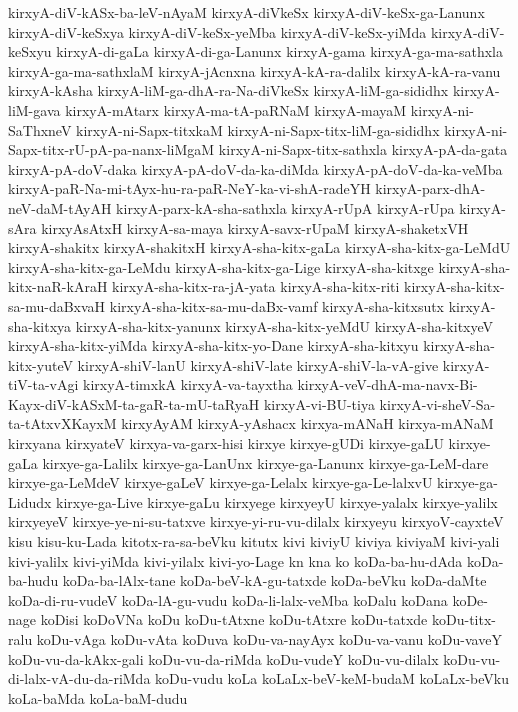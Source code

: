 {kirxyA-diV-kASx-ba-leV-nAyaM
kirxyA-diVkeSx
kirxyA-diV-keSx-ga-Lanunx
kirxyA-diV-keSxya
kirxyA-diV-keSx-yeMba
kirxyA-diV-keSx-yiMda
kirxyA-diV-keSxyu
kirxyA-di-gaLa
kirxyA-di-ga-Lanunx
kirxyA-gama
kirxyA-ga-ma-sathxla
kirxyA-ga-ma-sathxlaM
kirxyA-jAcnxna
kirxyA-kA-ra-dalilx
kirxyA-kA-ra-vanu
kirxyA-kAsha
kirxyA-liM-ga-dhA-ra-Na-diVkeSx
kirxyA-liM-ga-sididhx
kirxyA-liM-gava
kirxyA-mAtarx
kirxyA-ma-tA-paRNaM
kirxyA-mayaM
kirxyA-ni-SaThxneV
kirxyA-ni-Sapx-titxkaM
kirxyA-ni-Sapx-titx-liM-ga-sididhx
kirxyA-ni-Sapx-titx-rU-pA-pa-nanx-liMgaM
kirxyA-ni-Sapx-titx-sathxla
kirxyA-pA-da-gata
kirxyA-pA-doV-daka
kirxyA-pA-doV-da-ka-diMda
kirxyA-pA-doV-da-ka-veMba
kirxyA-paR-Na-mi-tAyx-hu-ra-paR-NeY-ka-vi-shA-radeYH
kirxyA-parx-dhA-neV-daM-tAyAH
kirxyA-parx-kA-sha-sathxla
kirxyA-rUpA
kirxyA-rUpa
kirxyA-sAra
kirxyAsAtxH
kirxyA-sa-maya
kirxyA-savx-rUpaM
kirxyA-shaketxVH
kirxyA-shakitx
kirxyA-shakitxH
kirxyA-sha-kitx-gaLa
kirxyA-sha-kitx-ga-LeMdU
kirxyA-sha-kitx-ga-LeMdu
kirxyA-sha-kitx-ga-Lige
kirxyA-sha-kitxge
kirxyA-sha-kitx-naR-kAraH
kirxyA-sha-kitx-ra-jA-yata
kirxyA-sha-kitx-riti
kirxyA-sha-kitx-sa-mu-daBxvaH
kirxyA-sha-kitx-sa-mu-daBx-vamf
kirxyA-sha-kitxsutx
kirxyA-sha-kitxya
kirxyA-sha-kitx-yanunx
kirxyA-sha-kitx-yeMdU
kirxyA-sha-kitxyeV
kirxyA-sha-kitx-yiMda
kirxyA-sha-kitx-yo-Dane
kirxyA-sha-kitxyu
kirxyA-sha-kitx-yuteV
kirxyA-shiV-lanU
kirxyA-shiV-late
kirxyA-shiV-la-vA-give
kirxyA-tiV-ta-vAgi
kirxyA-timxkA
kirxyA-va-tayxtha
kirxyA-veV-dhA-ma-navx-Bi-Kayx-diV-kASxM-ta-gaR-ta-mU-taRyaH
kirxyA-vi-BU-tiya
kirxyA-vi-sheV-Sa-ta-tAtxvXKayxM
kirxyAyAM
kirxyA-yAshacx
kirxya-mANaH
kirxya-mANaM
kirxyana
kirxyateV
kirxya-va-garx-hisi
kirxye
kirxye-gUDi
kirxye-gaLU
kirxye-gaLa
kirxye-ga-Lalilx
kirxye-ga-LanUnx
kirxye-ga-Lanunx
kirxye-ga-LeM-dare
kirxye-ga-LeMdeV
kirxye-gaLeV
kirxye-ga-Lelalx
kirxye-ga-Le-lalxvU
kirxye-ga-Lidudx
kirxye-ga-Live
kirxye-gaLu
kirxyege
kirxyeyU
kirxye-yalalx
kirxye-yalilx
kirxyeyeV
kirxye-ye-ni-su-tatxve
kirxye-yi-ru-vu-dilalx
kirxyeyu
kirxyoV-cayxteV
kisu
kisu-ku-Lada
kitotx-ra-sa-beVku
kitutx
kivi
kiviyU
kiviya
kiviyaM
kivi-yali
kivi-yalilx
kivi-yiMda
kivi-yilalx
kivi-yo-Lage
kn
kna
ko
koDa-ba-hu-dAda
koDa-ba-hudu
koDa-ba-lAlx-tane
koDa-beV-kA-gu-tatxde
koDa-beVku
koDa-daMte
koDa-di-ru-vudeV
koDa-lA-gu-vudu
koDa-li-lalx-veMba
koDalu
koDana
koDe-nage
koDisi
koDoVNa
koDu
koDu-tAtxne
koDu-tAtxre
koDu-tatxde
koDu-titx-ralu
koDu-vAga
koDu-vAta
koDuva
koDu-va-nayAyx
koDu-va-vanu
koDu-vaveY
koDu-vu-da-kAkx-gali
koDu-vu-da-riMda
koDu-vudeY
koDu-vu-dilalx
koDu-vu-di-lalx-vA-du-da-riMda
koDu-vudu
koLa
koLaLx-beV-keM-budaM
koLaLx-beVku
koLa-baMda
koLa-baM-dudu
}
